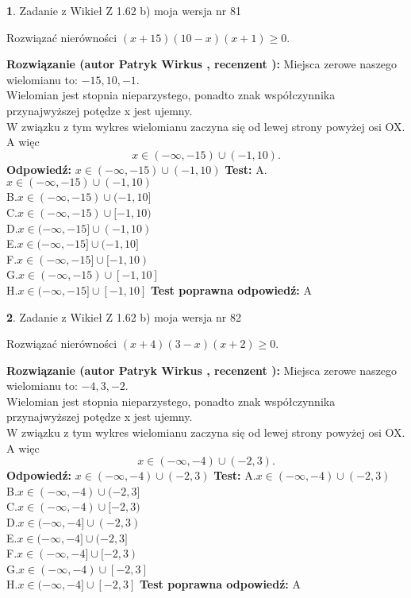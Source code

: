 \documentclass[12pt, a4paper]{article}
\theoremstyle{definition} %
\newtheorem{zad}{}
\newcommand{\zadStart}[1]{\begin{zad}#1\newline}
\newcommand{\zadStop}{\end{zad}}
\newcommand{\rozwStart}[2]{\noindent \textbf{Rozwiązanie (autor #1 , recenzent #2): }\newline}
\newcommand{\rozwStop}{\newline}
\newcommand{\odpStart}{\noindent \textbf{Odpowiedź:}\newline}
\newcommand{\odpStop}{\newline}
\newcommand{\testStart}{\noindent \textbf{Test:}\newline}
\newcommand{\testStop}{\newline}
\newcommand{\kluczStart}{\noindent \textbf{Test poprawna odpowiedź:}\newline}
\newcommand{\kluczStop}{\newline}
\begin{document}
\zadStart{Zadanie z Wikieł Z 1.62 b) moja wersja nr 81}

Rozwiązać nierówności $(x+15)(10-x)(x+1)\ge0$.
\zadStop
\rozwStart{Patryk Wirkus}{}
Miejsca zerowe naszego wielomianu to: $-15, 10, -1$.\\
Wielomian jest stopnia nieparzystego, ponadto znak współczynnika przy\linebreak najwyższej potędze x jest ujemny.\\ W związku z tym wykres wielomianu zaczyna się od lewej strony powyżej osi OX. A więc $$x \in (-\infty,-15) \cup (-1,10).$$
\rozwStop
\odpStart
$x \in (-\infty,-15) \cup (-1,10)$
\odpStop
\testStart
A.$x \in (-\infty,-15) \cup (-1,10)$\\
B.$x \in (-\infty,-15) \cup (-1,10]$\\
C.$x \in (-\infty,-15) \cup [-1,10)$\\
D.$x \in (-\infty,-15] \cup (-1,10)$\\
E.$x \in (-\infty,-15] \cup (-1,10]$\\
F.$x \in (-\infty,-15] \cup [-1,10)$\\
G.$x \in (-\infty,-15) \cup [-1,10]$\\
H.$x \in (-\infty,-15] \cup [-1,10]$
\testStop
\kluczStart
A
\kluczStop



\zadStart{Zadanie z Wikieł Z 1.62 b) moja wersja nr 82}

Rozwiązać nierówności $(x+4)(3-x)(x+2)\ge0$.
\zadStop
\rozwStart{Patryk Wirkus}{}
Miejsca zerowe naszego wielomianu to: $-4, 3, -2$.\\
Wielomian jest stopnia nieparzystego, ponadto znak współczynnika przy\linebreak najwyższej potędze x jest ujemny.\\ W związku z tym wykres wielomianu zaczyna się od lewej strony powyżej osi OX. A więc $$x \in (-\infty,-4) \cup (-2,3).$$
\rozwStop
\odpStart
$x \in (-\infty,-4) \cup (-2,3)$
\odpStop
\testStart
A.$x \in (-\infty,-4) \cup (-2,3)$\\
B.$x \in (-\infty,-4) \cup (-2,3]$\\
C.$x \in (-\infty,-4) \cup [-2,3)$\\
D.$x \in (-\infty,-4] \cup (-2,3)$\\
E.$x \in (-\infty,-4] \cup (-2,3]$\\
F.$x \in (-\infty,-4] \cup [-2,3)$\\
G.$x \in (-\infty,-4) \cup [-2,3]$\\
H.$x \in (-\infty,-4] \cup [-2,3]$
\testStop
\kluczStart
A
\kluczStop
\end{document}
